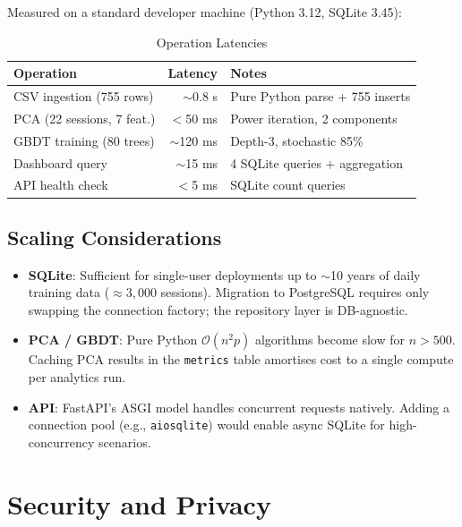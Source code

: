 \documentclass[12pt,a4paper]{report}
\begin{document}
Measured on a standard developer machine (Python 3.12, SQLite 3.45):

\begin{table}[h!]
\centering
\caption{Operation Latencies}
\begin{tabular}{lrl}
\toprule
\textbf{Operation} & \textbf{Latency} & \textbf{Notes} \\
\midrule
CSV ingestion (755 rows)   & $\sim$0.8 s  & Pure Python parse + 755 inserts \\
PCA (22 sessions, 7 feat.) & $<$50 ms     & Power iteration, 2 components \\
GBDT training (80 trees)   & $\sim$120 ms & Depth-3, stochastic 85\% \\
Dashboard query            & $\sim$15 ms  & 4 SQLite queries + aggregation \\
API health check           & $<$5 ms      & SQLite count queries \\
\bottomrule
\end{tabular}
\end{table}

\section{Scaling Considerations}

\begin{itemize}
  \item \textbf{SQLite}: Sufficient for single-user deployments up to $\sim$10 years
        of daily training data ($\approx 3{,}000$ sessions). Migration to PostgreSQL
        requires only swapping the connection factory; the repository layer is DB-agnostic.
  \item \textbf{PCA / GBDT}: Pure Python $\mathcal{O}(n^2p)$ algorithms become
        slow for $n > 500$. Caching PCA results in the \texttt{metrics} table
        amortises cost to a single compute per analytics run.
  \item \textbf{API}: FastAPI's ASGI model handles concurrent requests natively.
        Adding a connection pool (e.g., \texttt{aiosqlite}) would enable async
        SQLite for high-concurrency scenarios.
\end{itemize}

\chapter{Security and Privacy}
\end{document}
